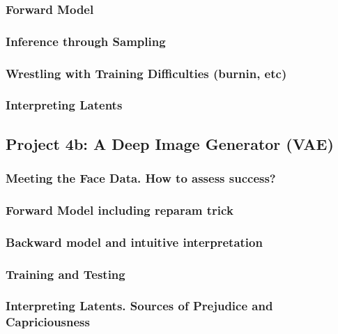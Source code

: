 \documentclass[12pt]{article}
\begin{document}
      \subsubsection*{Forward Model}
      \subsubsection*{Inference through Sampling}
      \subsubsection*{Wrestling with Training Difficulties (burnin, etc)}
      \subsubsection*{Interpreting Latents}
    \newpage

    \subsection*{Project 4b: A Deep Image Generator (VAE)}
      \subsubsection*{Meeting the Face Data.  How to assess success?} %
      \subsubsection*{Forward Model including reparam trick}
      \subsubsection*{Backward model and intuitive interpretation}
      \subsubsection*{Training and Testing}
      \subsubsection*{Interpreting Latents.  Sources of Prejudice and Capriciousness}
    \newpage
\end{document}
